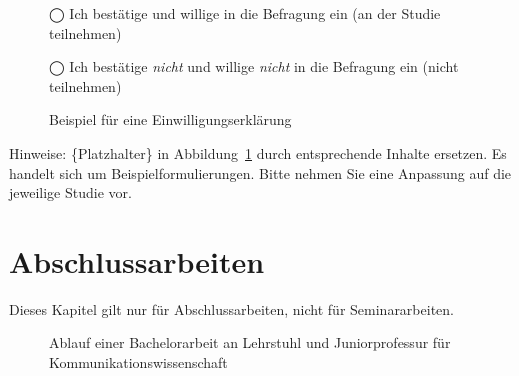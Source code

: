 \documentclass[
  letterpaper,
  DIV=11]{scrreprt}
\begin{document}
\begin{figure}
\hspace{0pt}\hspace{0pt}◯ Ich bestätige und willige in die Befragung ein
(an der Studie teilnehmen)

\hspace{0pt}\hspace{0pt}◯\hspace{0pt} Ich bestätige \emph{nicht} und
willige \emph{nicht} in die Befragung ein (nicht teilnehmen)

\caption{\label{fig-consent}Beispiel für eine Einwilligungserklärung}

\end{figure}%

Hinweise: \{Platzhalter\} in Abbildung~\ref{fig-consent} durch
entsprechende Inhalte ersetzen. Es handelt sich um
Beispielformulierungen. Bitte nehmen Sie eine Anpassung auf die
jeweilige Studie vor.

\chapter{Abschlussarbeiten}\label{abschlussarbeiten}

\begin{tcolorbox}[enhanced jigsaw, rightrule=.15mm, colframe=quarto-callout-important-color-frame, opacityback=0, toptitle=1mm, colbacktitle=quarto-callout-important-color!10!white, breakable, titlerule=0mm, colback=white, arc=.35mm, toprule=.15mm, leftrule=.75mm, bottomtitle=1mm, coltitle=black, left=2mm, title=\textcolor{quarto-callout-important-color}{\faExclamation}\hspace{0.5em}{Wichtig}, bottomrule=.15mm, opacitybacktitle=0.6]

Dieses Kapitel gilt nur für Abschlussarbeiten, nicht für
Seminararbeiten.

\end{tcolorbox}

\begin{figure}


\caption{\label{fig-ablauf}Ablauf einer Bachelorarbeit an Lehrstuhl und
Juniorprofessur für Kommunikationswissenschaft}

\end{figure}%
\end{document}
